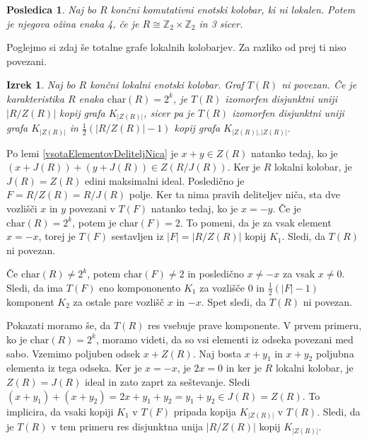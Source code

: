 \documentclass[a4paper, 12pt]{amsart}
\theoremstyle{definition} %
\theoremstyle{plain} %
\newtheorem{izrek}[definicija]{Izrek}
\newtheorem{posledica}[definicija]{Posledica}
\newcommand{\Z}{\mathbb Z}
\begin{document}
\begin{posledica}
Naj bo $R$ končni komutativni enotski kolobar, ki ni lokalen. Potem je njegova ožina enaka 4, če je $R \cong \Z_2 \times \Z_2$ in 3 sicer.
\end{posledica}

Poglejmo si zdaj še totalne grafe lokalnih kolobarjev. Za razliko od prej ti niso povezani.

\begin{izrek}
\label{klasifikacijaT(R)zaLokalenKolobar}
Naj bo $R$ končni lokalni enotski kolobar. Graf $T(R)$ ni povezan. Če je karakteristika $R$ enaka $\textrm{char} (R) = 2^k$, je $T(R)$ izomorfen disjunktni uniji $|R/Z(R)|$ kopij grafa $K_{|Z(R)|}$, sicer pa je $T(R)$ izomorfen disjunktni uniji grafa $K_{|Z(R)|}$ in $\frac{1}{2}(|R/Z(R)| - 1)$ kopij grafa    $K_{|Z(R)|, |Z(R)|}$.
\end{izrek}

\proof
Po lemi \ref{vsotaElementovDeliteljNica} je $x+y \in Z(R)$ natanko tedaj, ko  je $(x+J(R)) + (y+J(R))  \in Z(R/J(R))$. Ker je $R$ lokalni kolobar, je $J(R) = Z(R)$ edini maksimalni ideal. Posledično je $ F = R/Z(R) = R/J(R)$ polje. Ker ta nima pravih deliteljev niča, sta dve vozlišči $x$ in $y$ povezani v $T(F)$ natanko tedaj, ko je $x=-y$. 
Če je $\textrm{char}(R) = 2^k$, potem je $\textrm{char}(F) = 2$. To pomeni, da je za vsak element $x = -x$, torej je $T(F)$ sestavljen iz $|F| = |R/Z(R)|$ kopij $K_1$. Sledi, da $T(R)$ ni povezan.

Če $\textrm{char}(R) \neq 2^k$, potem $\textrm{char}(F)\neq 2$ in posledično $x\neq -x$ za vsak $x\neq 0$. Sledi, da ima $T(F)$ eno kompononento $K_1$ za vozlišče 0 in $\frac{1}{2}(|F| - 1)$ komponent $K_2$ za ostale pare vozlišč $x$ in $-x$. Spet sledi, da $T(R)$ ni povezan.

 Pokazati moramo še, da $T(R)$ res vsebuje prave komponente.
V prvem primeru, ko je $ \textrm{char}(R) = 2^k$, moramo videti, da so vsi elementi iz odseka povezani med sabo. Vzemimo poljuben odsek $x+Z(R)$. Naj bosta $x+ y_1$ in $x+y_2$ poljubna elementa iz tega odseka. Ker je $x=-x$, je $2x = 0$ in ker je $R$ lokalni kolobar, je $Z(R) = J(R)$ ideal in zato zaprt za seštevanje. Sledi $(x+ y_1 ) + (x+y_2)  = 2x + y_1 +y_2 = y_1 + y_2 \in J(R) = Z(R)$. To implicira, da vsaki kopiji $K_1$ v $T(F)$ pripada kopija $K_{|Z(R)|}$ v $T(R)$. Sledi, da je $T(R)$ v tem primeru res disjunktna unija $|R/Z(R)|$ kopij $K_{|Z(R)|}$.
\end{document}
